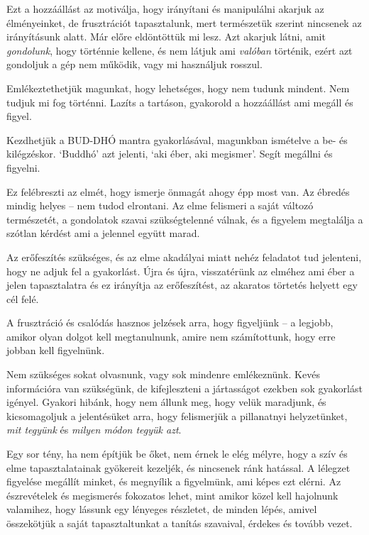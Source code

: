 Ezt a hozzáállást az motiválja, hogy irányítani és manipulálni akarjuk
az élményeinket, de frusztrációt tapasztalunk, mert természetük szerint
nincsenek az irányításunk alatt. Már előre eldöntöttük mi lesz. Azt
akarjuk látni, amit \emph{gondolunk}, hogy történnie kellene, és nem
látjuk ami \emph{valóban} történik, ezért azt gondoljuk a gép nem
működik, vagy mi használjuk rosszul.

Emlékeztethetjük magunkat, hogy lehetséges, hogy nem tudunk mindent. Nem
tudjuk mi fog történni. Lazíts a tartáson, gyakorold a hozzáállást ami
megáll és figyel.


Kezdhetjük a BUD-DHÓ mantra gyakorlásával, magunkban ismételve a be- és
kilégzéskor. `Buddhó' azt jelenti, `aki éber, aki megismer'. Segít
megállni és figyelni.

Ez felébreszti az elmét, hogy ismerje önmagát ahogy épp most van. Az
ébredés mindig helyes -- nem tudod elrontani. Az elme felismeri a saját
változó természetét, a gondolatok szavai szükségtelenné válnak, és a
figyelem megtalálja a szótlan kérdést ami a jelennel együtt marad.

Az erőfeszítés szükséges, és az elme akadályai miatt nehéz feladatot tud
jelenteni, hogy ne adjuk fel a gyakorlást. Újra és újra, visszatérünk az
elméhez ami éber a jelen tapasztalatra és ez irányítja az erőfeszítést,
az akaratos törtetés helyett egy cél felé.

A frusztráció és csalódás hasznos jelzések arra, hogy figyeljünk -- a
legjobb, amikor olyan dolgot kell megtanulnunk, amire nem számítottunk,
hogy erre jobban kell figyelnünk.

Nem szükséges sokat olvasnunk, vagy sok mindenre emlékeznünk. Kevés
információra van szükségünk, de kifejleszteni a jártasságot ezekben sok
gyakorlást igényel. Gyakori hibánk, hogy nem állunk meg, hogy velük
maradjunk, és kicsomagoljuk a jelentésüket arra, hogy felismerjük a
pillanatnyi helyzetünket, \emph{mit tegyünk} és \emph{milyen módon
tegyük azt}.

Egy sor tény, ha nem építjük be őket, nem érnek le elég mélyre, hogy a
szív és elme tapasztalatainak gyökereit kezeljék, és nincsenek ránk
hatással. A lélegzet figyelése megállít minket, és megnyílik a
figyelmünk, ami képes ezt elérni. Az észrevételek és megismerés
fokozatos lehet, mint amikor közel kell hajolnunk valamihez, hogy
lássunk egy lényeges részletet, de minden lépés, amivel összekötjük a
saját tapasztaltunkat a tanítás szavaival, érdekes és tovább vezet.

